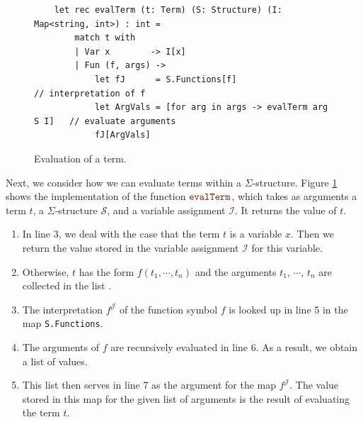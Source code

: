 \begin{figure}[!ht]
\centering
\begin{verbatim}
    let rec evalTerm (t: Term) (S: Structure) (I: Map<string, int>) : int =
        match t with
        | Var x        -> I[x]
        | Fun (f, args) ->
            let fJ      = S.Functions[f]                          // interpretation of f
            let ArgVals = [for arg in args -> evalTerm arg S I]   // evaluate arguments
            fJ[ArgVals]
\end{verbatim}
\vspace*{-0.3cm}
\caption{Evaluation of a term.}
\label{fig:evalTerm.ipynb}
\end{figure}

Next, we consider how we can evaluate terms within  a $\Sigma$-structure.
Figure \ref{fig:evalTerm.ipynb} shows the implementation of the function
$\mytt{evalTerm}$, which takes as arguments a term $t$, a
 $\Sigma$-structure $\mathcal{S}$, and a variable assignment $\mathcal{I}$.  It returns the value of $t$.
\begin{enumerate}
\item In line 3, we deal with the case that the term $t$ is a variable $x$.  Then 
      we return the value stored in the variable assignment $\mathcal{I}$ for this variable.
\item Otherwise, $t$ has the form $f(t_1, \cdots, t_n)$ and the arguments $t_1$, $\cdots$, $t_n$ are collected
      in the list .
\item The interpretation $f^\mathcal{J}$ of the function symbol $f$ is looked up in line 5 in the map
      \texttt{S.Functions}.
\item The arguments of $f$ are recursively evaluated in line 6.
      As a result, we obtain a list of values.
\item This list then serves in line 7 as the argument for the map $f^\mathcal{J}$. The value stored in this
      map for the given list of arguments is the result of evaluating the term $t$.
\end{enumerate}



